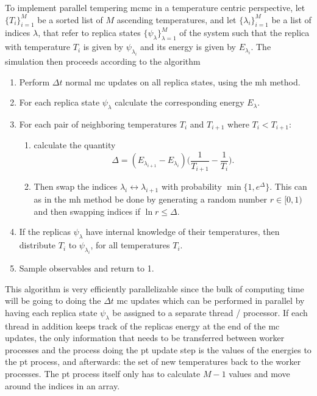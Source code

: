 To implement parallel tempering \ac{mcmc} in a temperature centric perspective,
let $\{T_i\}_{i=1}^M$ be a sorted list of $M$ ascending temperatures, and let $\{\lambda_i\}_{i=1}^M$
be a list of indices $\lambda$, that refer to replica states $\{\psi_\lambda\}_{\lambda=1}^M$ of the system such that the replica with temperature $T_i$
is given by $\psi_{\lambda_i}$ and its energy is given by $E_{\lambda_i}$.
The simulation then proceeds according to the algorithm
\begin{enumerate}
    \item Perform $\Delta t$ normal \ac{mc} updates on all replica states, \eg using the \ac{mh} method.
    \item For each replica state $\psi_\lambda$ calculate the corresponding energy $E_\lambda$.
    \item For each pair of neighboring temperatures $T_i$ and $T_{i+1}$ where $T_i<T_{i+1}$:
        \begin{enumerate}
            \item calculate the quantity
            \begin{equation}
                \label{eq:Monte:PT:delta}
                \Delta = (E_{\lambda_{i+1}} - E_{\lambda_i})\Big(\frac{1}{T_{i+1}} - \frac{1}{T_i}\Big).
            \end{equation}
            \item Then swap the indices $\lambda_i \leftrightarrow \lambda_{i+1}$ with probability $\min\{1, e^\Delta\}$. This can
                as in the \ac{mh} method be done by generating a random number $r\in[0,1)$ and then swapping indices if
                $\ln r \leq \Delta$.
        \end{enumerate}
    \item If the replicas $\psi_\lambda$ have internal knowledge of their temperatures, then distribute $T_i$ to $\psi_{\lambda_i}$, for all
        temperatures $T_i$.
    \item Sample observables and return to 1.
\end{enumerate}

This algorithm is very efficiently parallelizable since the bulk of computing time will be going to doing the $\Delta t$ \ac{mc} updates which can
be performed in parallel by having each replica state $\psi_\lambda$ be assigned to a separate thread / processor. If each thread in addition
keeps track of the replicas energy at the end of the \ac{mc} updates, the only information that needs to be transferred between worker processes and
the process doing the \ac{pt} update step is the values of the energies to the \ac{pt} process, and afterwards: the set of new temperatures
back to the worker processes. The \ac{pt} process itself only has to 
calculate $M-1$ values and move around the indices in an array.

